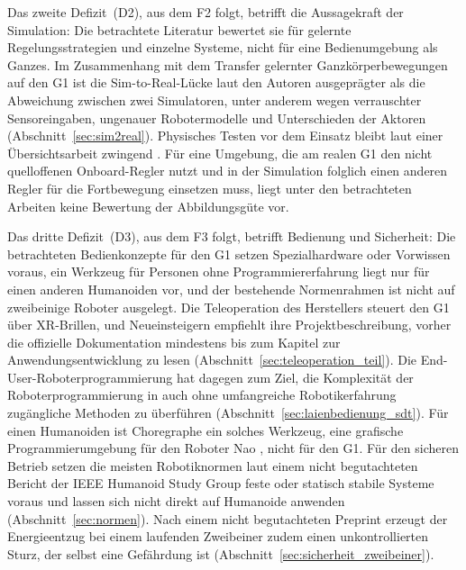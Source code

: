 Das zweite Defizit~(D2), aus dem F2 folgt, betrifft die Aussagekraft der Simulation: Die betrachtete Literatur bewertet sie für gelernte Regelungsstrategien und einzelne Systeme, nicht für eine Bedienumgebung als Ganzes.
Im Zusammenhang mit dem Transfer gelernter Ganzkörperbewegungen auf den G1 ist die Sim-to-Real-Lücke laut den Autoren ausgeprägter als die Abweichung zwischen zwei Simulatoren, unter anderem wegen verrauschter Sensoreingaben, ungenauer Robotermodelle und Unterschieden der Aktoren \cite{He2025} (Abschnitt~\ref{sec:sim2real}).
Physisches Testen vor dem Einsatz bleibt laut einer Übersichtsarbeit zwingend \cite{Choi2021}.
Für eine Umgebung, die am realen G1 den nicht quelloffenen Onboard-Regler nutzt und in der Simulation folglich einen anderen Regler für die Fortbewegung einsetzen muss, liegt unter den betrachteten Arbeiten keine Bewertung der Abbildungsgüte vor.

Das dritte Defizit~(D3), aus dem F3 folgt, betrifft Bedienung und Sicherheit: Die betrachteten Bedienkonzepte für den G1 setzen Spezialhardware oder Vorwissen voraus, ein Werkzeug für Personen ohne Programmiererfahrung liegt nur für einen anderen Humanoiden vor, und der bestehende Normenrahmen ist nicht auf zweibeinige Roboter ausgelegt.
Die Teleoperation des Herstellers steuert den G1 über XR-Brillen, und Neueinsteigern empfiehlt ihre Projektbeschreibung, vorher die offizielle Dokumentation mindestens bis zum Kapitel zur Anwendungsentwicklung zu lesen \cite{UnitreeXRTeleop} (Abschnitt~\ref{sec:teleoperation_teil}).
Die End-User-Roboter\-pro\-gram\-mie\-rung hat dagegen zum Ziel, die Komplexität der Roboterprogrammierung in auch ohne umfangreiche Robotikerfahrung zugängliche Methoden zu überführen \cite{Ajaykumar2021} (Abschnitt~\ref{sec:laienbedienung_sdt}).
Für einen Humanoiden ist Choregraphe ein solches Werkzeug, eine grafische Programmierumgebung für den Roboter Nao \cite{Pot2009}, nicht für den G1.
Für den sicheren Betrieb setzen die meisten Robotiknormen laut einem nicht begutachteten Bericht der IEEE Humanoid Study Group feste oder statisch stabile Systeme voraus \cite{Prather2025} und lassen sich nicht direkt auf Humanoide anwenden \cite{Prather2025} (Abschnitt~\ref{sec:normen}).
Nach einem nicht begutachteten Preprint erzeugt der Energieentzug bei einem laufenden Zweibeiner zudem einen unkontrollierten Sturz, der selbst eine Gefährdung ist \cite{Ding2026} (Abschnitt~\ref{sec:sicherheit_zweibeiner}).

